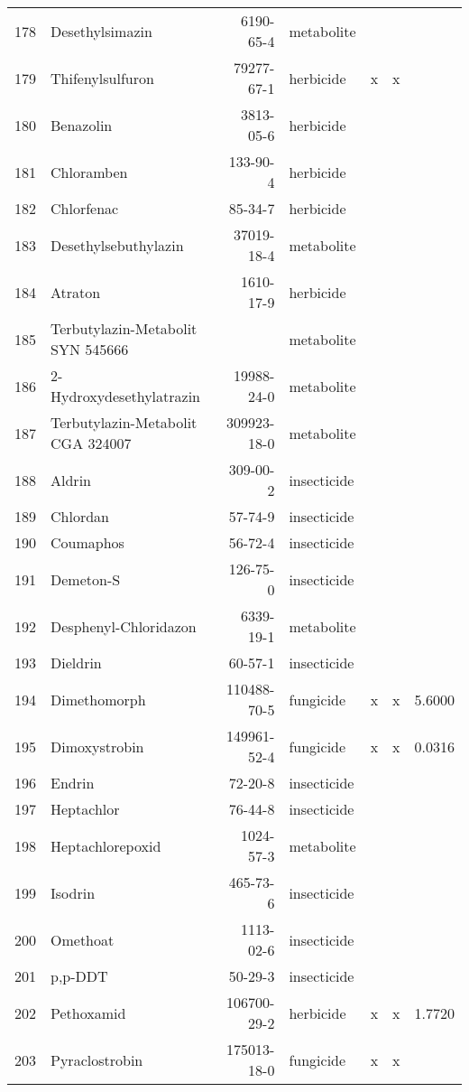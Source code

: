 \begin{longtable}{lp{3cm}rlp{0.5cm}p{0.5cm}p{1.5cm}}
  178 & Desethylsimazin & 6190-65-4 & metabolite &  &  &  \\ 
  179 & Thifenylsulfuron & 79277-67-1 & herbicide & x & x &  \\ 
  180 & Benazolin & 3813-05-6 & herbicide &  &  &  \\ 
  181 & Chloramben & 133-90-4 & herbicide &  &  &  \\ 
  182 & Chlorfenac & 85-34-7 & herbicide &  &  &  \\ 
  183 & Desethylsebuthylazin & 37019-18-4 & metabolite &  &  &  \\ 
  184 & Atraton & 1610-17-9 & herbicide &  &  &  \\ 
  185 & Terbutylazin-Metabolit SYN 545666 &  & metabolite &  &  &  \\ 
  186 & 2-Hydroxydesethylatrazin & 19988-24-0 & metabolite &  &  &  \\ 
  187 & Terbutylazin-Metabolit CGA 324007 & 309923-18-0 & metabolite &  &  &  \\ 
  188 & Aldrin & 309-00-2 & insecticide &  &  &  \\ 
  189 & Chlordan & 57-74-9 & insecticide &  &  &  \\ 
  190 & Coumaphos & 56-72-4 & insecticide &  &  &  \\ 
  191 & Demeton-S & 126-75-0 & insecticide &  &  &  \\ 
  192 & Desphenyl-Chloridazon & 6339-19-1 & metabolite &  &  &  \\ 
  193 & Dieldrin & 60-57-1 & insecticide &  &  &  \\ 
  194 & Dimethomorph & 110488-70-5 & fungicide & x & x & 5.6000 \\ 
  195 & Dimoxystrobin & 149961-52-4 & fungicide & x & x & 0.0316 \\ 
  196 & Endrin & 72-20-8 & insecticide &  &  &  \\ 
  197 & Heptachlor & 76-44-8 & insecticide &  &  &  \\ 
  198 & Heptachlorepoxid & 1024-57-3 & metabolite &  &  &  \\ 
  199 & Isodrin & 465-73-6 & insecticide &  &  &  \\ 
  200 & Omethoat & 1113-02-6 & insecticide &  &  &  \\ 
  201 & p,p-DDT & 50-29-3 & insecticide &  &  &  \\ 
  202 & Pethoxamid & 106700-29-2 & herbicide & x & x & 1.7720 \\ 
  203 & Pyraclostrobin & 175013-18-0 & fungicide & x & x &  \\ 

\end{longtable}

